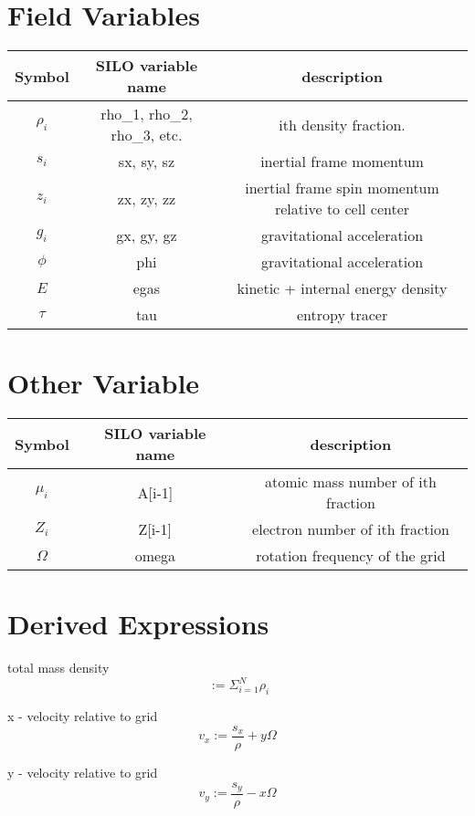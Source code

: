 \documentclass{article}
\begin{document}
\section{ Field Variables }
\begin{tabular}{|c|c|c|}
\hline
Symbol & SILO variable name & description \\
\hline
$\rho_i$ & rho\_1, rho\_2, rho\_3, etc. & ith density fraction. \\
$s_i$ & sx, sy, sz & inertial frame momentum \\
$z_i$ & zx, zy, zz & inertial frame spin momentum relative to cell center \\
$g_i$ & gx, gy, gz & gravitational acceleration \\
$\phi$ & phi & gravitational acceleration \\
$E$ & egas & kinetic + internal energy density \\
$\tau$ & tau & entropy tracer \\
\hline
\end{tabular}

\section{ Other Variable}

\begin{tabular}{|c|c|c|}
\hline
Symbol & SILO variable name & description \\
\hline
$\mu_i$ & A[i-1]  & atomic mass number of ith fraction \\ 
$Z_i$ & Z[i-1]  & electron number of ith fraction \\ 
$\Omega$ & omega & rotation frequency of the grid \\
\hline
\end{tabular}


\section{Derived Expressions}

total mass density
\begin{equation}
\
 := \Sigma_{i=1}^N \rho_i 
\end{equation}

x - velocity relative to grid
\begin{equation}
v_x  := \frac{s_x}{\rho} + y \Omega 
\end{equation}

y - velocity relative to grid
\begin{equation}
v_y  := \frac{s_y}{\rho} - x \Omega 
\end{equation}
\end{document}
